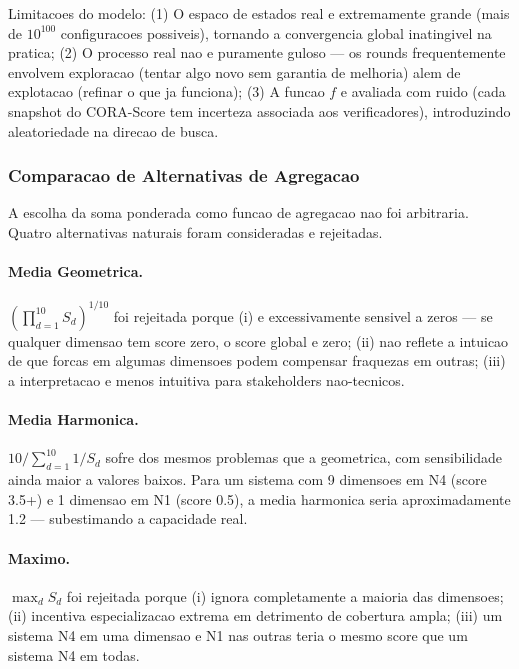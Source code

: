Limitacoes do modelo: (1) O espaco de estados real e extremamente grande
(mais de $10^{100}$ configuracoes possiveis), tornando a convergencia
global inatingivel na pratica; (2) O processo real nao e puramente
guloso --- os rounds frequentemente envolvem exploracao (tentar algo novo
sem garantia de melhoria) alem de explotacao (refinar o que ja funciona);
(3) A funcao $f$ e avaliada com ruido (cada snapshot do CORA-Score tem
incerteza associada aos verificadores), introduzindo aleatoriedade na
direcao de busca.

\subsubsection{Comparacao de Alternativas de Agregacao}

A escolha da soma ponderada como funcao de agregacao nao foi arbitraria.
Quatro alternativas naturais foram consideradas e rejeitadas.

\paragraph{Media Geometrica.}

$(\prod_{d=1}^{10} S_d)^{1/10}$ foi rejeitada porque (i) e
excessivamente sensivel a zeros --- se qualquer dimensao tem score zero,
o score global e zero; (ii) nao reflete a intuicao de que forcas em
algumas dimensoes podem compensar fraquezas em outras; (iii) a
interpretacao e menos intuitiva para stakeholders nao-tecnicos.

\paragraph{Media Harmonica.}

$10 / \sum_{d=1}^{10} 1/S_d$ sofre dos mesmos problemas que a geometrica,
com sensibilidade ainda maior a valores baixos. Para um sistema com 9
dimensoes em N4 (score 3.5+) e 1 dimensao em N1 (score 0.5), a media
harmonica seria aproximadamente 1.2 --- subestimando a capacidade real.

\paragraph{Maximo.}

$\max_d S_d$ foi rejeitada porque (i) ignora completamente a maioria das
dimensoes; (ii) incentiva especializacao extrema em detrimento de
cobertura ampla; (iii) um sistema N4 em uma dimensao e N1 nas outras
teria o mesmo score que um sistema N4 em todas.

